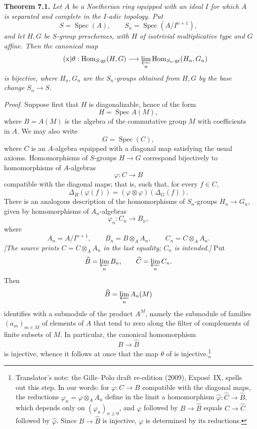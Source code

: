 \medskip
\noindent{}\textbf{Theorem 7.1.}
\textit{Let \(A\) be a Noetherian ring equipped with an ideal \(I\) for
which \(A\) is separated and complete in the \(I\)-adic topology. Put
\[
  S=\operatorname{Spec}(A),
  \qquad
  S_n=\operatorname{Spec}(A/I^{n+1}),
\]
and let \(H,G\) be \(S\)-group preschemes, with \(H\) of isotrivial
multiplicative type and \(G\) affine. Then the canonical map
\begin{equation}
  \tag{x}
  \theta:
  \operatorname{Hom}_{S\text{-}\mathrm{gr}}(H,G)
  \longrightarrow
  \varprojlim_n
  \operatorname{Hom}_{S_n\text{-}\mathrm{gr}}(H_n,G_n)
\end{equation}
is bijective, where \(H_n,G_n\) are the \(S_n\)-groups obtained from
\(H,G\) by the base change \(S_n\to S\).}

\emph{Proof.}
Suppose first that \(H\) is diagonalizable, hence of the form
\[
  H=\operatorname{Spec}A(M),
\]
where \(B=A(M)\) is the algebra of the commutative group \(M\) with
coefficients in \(A\). We may also write
\[
  G=\operatorname{Spec}(C),
\]
where \(C\) is an \(A\)-algebra equipped with a diagonal map satisfying
the usual axioms. Homomorphisms of \(S\)-groups \(H\to G\) correspond
bijectively to homomorphisms of \(A\)-algebras
\[
  \varphi:C\longrightarrow B
\]
compatible with the diagonal maps; that is, such that, for every
\(f\in C\),
\[
  \Delta_H(\varphi(f))
  =(\varphi\otimes\varphi)(\Delta_G(f)).
\]
There is an analogous description of the homomorphisms of \(S_n\)-groups
\(H_n\to G_n\), given by homomorphisms of \(A_n\)-algebras
\[
  \varphi_n:C_n\longrightarrow B_n,
\]
where
\[
  A_n=A/I^{n+1},
  \qquad
  B_n=B\otimes_AA_n,
  \qquad
  C_n=C\otimes_AA_n.
\]
\emph{[The source prints \(C=C\otimes_AA_n\) in the last equality;
\(C_n\) is intended.]}
Put
\[
  \widehat B=\varprojlim_n B_n,
  \qquad
  \widehat C=\varprojlim_n C_n.
\]
Then
\[
  \widehat B=\varprojlim_n A_n(M)
\]
identifies with a submodule of the product \(A^M\), namely the submodule
of families \((a_m)_{m\in M}\) of elements of \(A\) that tend to zero
along the filter of complements of finite subsets of \(M\). In particular, the canonical homomorphism
\[
  B\longrightarrow\widehat B
\]
is injective, whence it follows at once that the map \(\theta\) of
 is injective.\footnote{Translator's
note: the Gille--Polo draft re-edition (2009), Expos\'e~IX, spells out this
step. In our words: for \(\varphi:C\to B\) compatible with the diagonal maps,
the reductions \(\varphi_n=\varphi\otimes_AA_n\) define in the limit a
homomorphism \(\widehat\varphi:\widehat C\to\widehat B\), which depends only
on \((\varphi_n)_{n\geq0}\), and \(\varphi\) followed by \(B\to\widehat B\)
equals \(C\to\widehat C\) followed by \(\widehat\varphi\). Since
\(B\to\widehat B\) is injective, \(\varphi\) is determined by its
reductions.}

